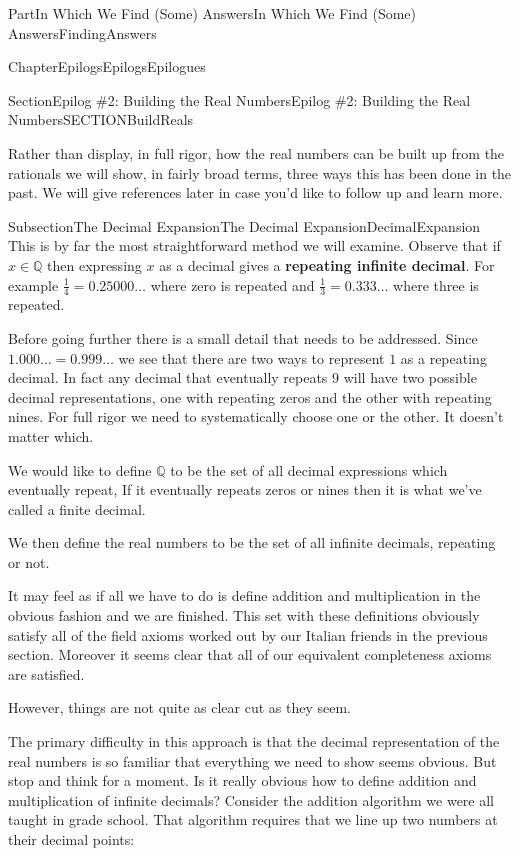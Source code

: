 \documentclass[oneside,10pt,]{book}
\newcommand{\terminology}[1]{\textbf{#1}}
\numberwithin{equation}{part}
\newcommand{\QQ}{\mathbb {Q}}
\begin{document}
\begin{partptx}{Part}{In Which We Find (Some) Answers}{}{In Which We Find (Some) Answers}{}{}{FindingAnswers}
\begin{chapterptx}{Chapter}{Epilogs}{}{Epilogs}{}{}{Epilogues}
\begin{sectionptx}{Section}{Epilog \#2: Building the Real Numbers}{}{Epilog \#2: Building the Real Numbers}{}{}{SECTIONBuildReals}
\begin{introduction}{}
\par
Rather than display, in full rigor, how the real numbers can be built up from the rationals we will show, in fairly broad terms, three ways this has been done in the past.  We will give references later in case you'd like to follow up and learn more.%
\end{introduction}%
%
%
\typeout{************************************************}
\typeout{************************************************}
%
\begin{subsectionptx}{Subsection}{The Decimal Expansion}{}{The Decimal Expansion}{}{}{DecimalExpansion}
This is by far the most straightforward method we will examine.  Observe that if \(x\in\QQ\) then expressing \(x\) as a decimal gives a \terminology{repeating infinite decimal}. For example \(\frac{1}{4}=0.25000\ldots{}\) where zero is repeated and \(\frac13 =0.333\ldots{}\) where three is repeated.%
\par
Before going further there is a small detail that needs to be addressed. Since \(1.000\ldots=0.999\ldots{}\) we see that there are two ways to represent \(1\) as a repeating decimal. In fact any decimal that eventually repeats \(9\) will have two possible decimal representations, one with repeating zeros and the other with repeating nines. For full rigor we need to systematically choose one or the other. It doesn't matter which.%
\par
We would like to define \(\QQ\) to be the set of all decimal expressions which eventually repeat,    If it eventually repeats zeros or nines then it is what we've called a finite decimal.%
\par
We then define the real numbers to be the set of all infinite decimals, repeating or not.%
\par
It may feel as if all we have to do is define addition and multiplication in the obvious fashion and we are finished. This set with these definitions obviously satisfy all of the field axioms worked out by our Italian friends in the previous section.  Moreover it seems clear that all of our equivalent completeness axioms are satisfied.%
\par
However, things are not quite as clear cut as they seem.%
\par
The primary difficulty in this approach is that the decimal representation of the real numbers is so familiar that everything we need to show seems obvious.  But stop and think for a moment.  Is it really obvious how to define addition and multiplication of infinite decimals? Consider the addition algorithm we were all taught in grade school.  That algorithm requires that we line up two numbers at their decimal points:%

\end{subsectionptx}
\end{sectionptx}
\end{chapterptx}
\end{partptx}
\end{document}

